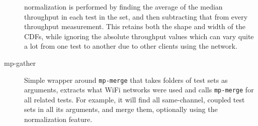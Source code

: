 \begin{description}
    normalization is performed by finding the average of the median throughput
    in each test in the set, and then subtracting that from every throughput
    measurement. This retains both the shape and width of the CDFs, while
    ignoring the absolute throughput values which can vary quite a lot from one
    test to another due to other clients using the network.
  \item[mp-gather]
    Simple wrapper around \texttt{mp-merge} that takes folders of test sets as
    arguments, extracts what WiFi networks were used and calls \texttt{mp-merge}
    for all related tests. For example, it will find all same-channel, coupled
    test sets in all its arguments, and merge them, optionally using the
    normalization feature.
\end{description}
